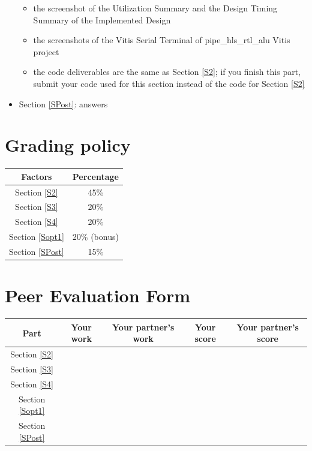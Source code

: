 \documentclass[a4paper,12pt,twoside]{article}
\begin{document}
\begin{itemize}
\begin{itemize}
        \item the screenshot of the Utilization Summary and the Design Timing Summary of the Implemented Design
        \item the screenshots of the Vitis Serial Terminal of pipe\_hls\_rtl\_alu Vitis project
        \item the code deliverables are the same as Section \ref{S2}; if you finish this part, submit your code used for this section instead of the code for Section \ref{S2}
    \end{itemize}
    \item Section \ref{SPost}: answers
\end{itemize}
\section{Grading policy}
\begin{table}[H]
    \centering
    \begin{tabular}{|c|c|}
        \hline
        Factors & Percentage \\
        \hline
        Section \ref{S2} & 45\% \\
        \hline
        Section \ref{S3} & 20\% \\
        \hline
        Section \ref{S4} & 20\% \\
        \hline
        Section \ref{Sopt1} & 20\% (bonus) \\
        \hline
        Section \ref{SPost} & 15\% \\
        \hline
    \end{tabular}
\end{table}

\newpage
\appendix
\section{Peer Evaluation Form}
\begin{table}[H]
    \centering
    \begin{tabular}{|c|c|c|c|c|}
        \hline
        Part & Your work & Your partner's work & Your score & Your partner's score \\
        \hline
        Section \ref{S2} & & & & \\
        \hline
        Section \ref{S3} & & & & \\
        \hline
        Section \ref{S4} & & & & \\
        \hline
        Section \ref{Sopt1} & & & & \\
        \hline
        Section \ref{SPost} & & & & \\
        \hline
    \end{tabular}
\end{table}
\end{document}
